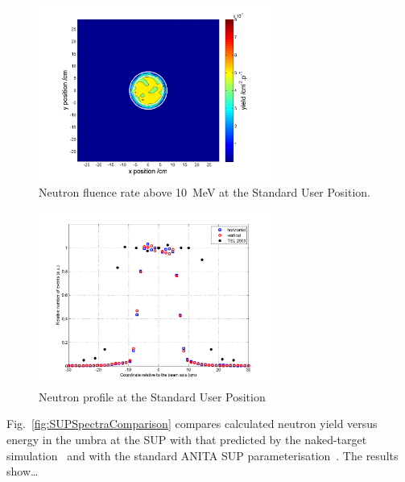 \documentclass[11pt,a4paper]{IEEEtran}
\let\MYoriglatexcaption\caption
\renewcommand{\caption}[2][\relax]{\MYoriglatexcaption[#2]{#2}}
\begin{document}
\begin{figure}[t]
    \vspace{2in}
    \includegraphics[width=3in]{SUP10ColSpatialDistribution10MeVRADECS.png}
    \caption{Neutron fluence rate above \SI{10}{\MeV} at the Standard User Position.}
    \label{fig:SUPDensity}
\end{figure}

\begin{figure}[t]
    \vspace{2in}
    \includegraphics[width=3in]{SUP10beamproFoldingRADECS.png}
    \caption{Neutron profile at the Standard User Position}
    \label{fig:SUPProfile}
\end{figure}

Fig.~\ref{fig:SUPSpectraComparison} compares calculated neutron yield versus energy in the umbra at the SUP with that predicted by the naked-target simulation~\cite{Platt13} and with the standard ANITA SUP parameterisation~\cite{Prokofiev2009}.
The results show\ldots{}
\end{document}
